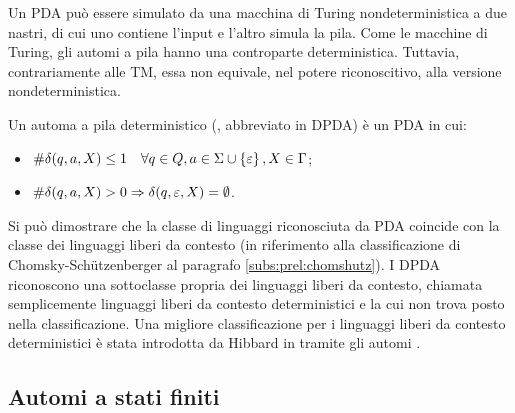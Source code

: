 Un PDA può essere simulato da una macchina di Turing nondeterministica a due nastri, di cui uno contiene l'input e l'altro simula la pila.
Come le macchine di Turing, gli automi a pila hanno una controparte deterministica. Tuttavia, contrariamente alle TM, essa non equivale, nel potere riconoscitivo, alla versione nondeterministica.
\begin{defin}
	Un automa a pila deterministico (, abbreviato in DPDA) è un PDA in cui:
	\begin{itemize}
		\item $\# \delta(q,a,X)\leq 1\quad \forall q\in Q, a\in\Sigma\cup\left\{ \varepsilon \right\}, X\in\Gamma$;
		\item $\# \delta(q,a,X)>0\Rightarrow \delta(q,\varepsilon,X)=\emptyset$.
	\end{itemize}
\end{defin}

Si può dimostrare che la classe di linguaggi riconosciuta da PDA coincide con la classe dei linguaggi liberi da contesto (in riferimento alla classificazione di Chomsky-Schützenberger al paragrafo \ref{subs:prel:chomshutz}). I DPDA riconoscono una sottoclasse propria dei linguaggi liberi da contesto, chiamata semplicemente linguaggi liberi da contesto deterministici e la cui non trova posto nella classificazione. Una migliore classificazione per i linguaggi liberi da contesto deterministici è stata introdotta da Hibbard in \cite{Hibbard:67:CFdet} tramite gli automi .


\subsection{Automi a stati finiti}\label{subs:prel:NFA}

